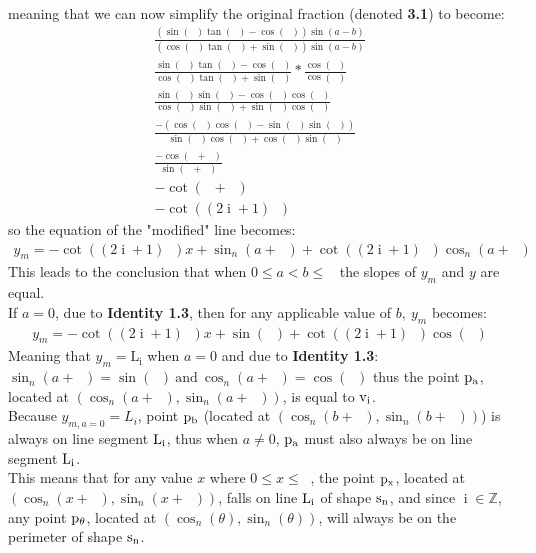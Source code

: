 \documentclass[11pt]{article}
\DeclareMathOperator{\custi}{\mathrm{i}}
\DeclareMathOperator{\period}{\frac{2\pi}{n}}
\DeclareMathOperator{\hp}{\frac{\pi}{n}}
\DeclareMathOperator{\iperiod}{\custi\frac{2\pi}{n}}
\begin{document}
\pagebreak\\
meaning that we can now simplify the original fraction (denoted \textbf{3.1}) to become:
\begin{gather*}
\frac{(\sin(\iperiod)\tan(\hp)-\cos(\iperiod))\sin(a-b)}{(\cos(\iperiod)\tan(\hp)+\sin(\iperiod))\sin(a-b)}\\
\frac{\sin(\iperiod)\tan(\hp)-\cos(\iperiod)}{\cos(\iperiod)\tan(\hp)+\sin(\iperiod)} * \frac{\cos(\hp)}{\cos(\hp)}\\
\frac{\sin(\iperiod)\sin(\hp)-\cos(\iperiod)\cos(\hp)}{\cos(\iperiod)\sin(\hp)+\sin(\iperiod)\cos(\hp)}\\
\frac{-(\cos(\iperiod)\cos(\hp)-\sin(\iperiod)\sin(\hp))}{\sin(\hp)\cos(\iperiod)+\cos(\hp)\sin(\iperiod)}\\
\frac{-\cos(\iperiod+\hp)}{\sin(\iperiod+\hp)}\\
-\cot(\iperiod+\hp)\\
-\cot((2\custi+1)\hp)
\end{gather*}
so the equation of the "modified" line becomes:
\begin{gather*}
y_m=-\cot((2\custi+1)\hp)x+\sin_n(a+\iperiod)+\cot((2\custi+1)\hp)\cos_n(a+\iperiod)
\end{gather*}
This leads to the conclusion that when \(0\leq a<b\leq\period\) the slopes of \(y_m\) and \(y\) are equal. \\
If \(a=0\), due to \textbf{Identity 1.3}, then for any applicable value of \(b,\ y_m\) becomes:
\begin{gather*}
y_m=-\cot((2\custi+1)\hp)x+\sin(\iperiod)+\cot((2\custi+1)\hp)\cos(\iperiod)
\end{gather*}
Meaning that \(y_m=\mathrm{L_i}\) when \(a=0\) and due to \textbf{Identity 1.3}: \(\sin_n(a+\iperiod)=\sin(\iperiod) \mathrm{\ and\ } \cos_n(a+\iperiod)=\cos(\iperiod)\) thus the point \(\rm p_a\), located at \((\cos_n(a+\iperiod), \sin_n(a+\iperiod))\), is equal to \(\rm v_i\).\\
Because \(y_{m,a=0} = L_i\), point \(\rm p_b\) (located at \((\cos_n(b+\iperiod),\sin_n(b+\iperiod))\)) is always on line segment \(\rm L_i\), thus when \(a\neq0\), \(\rm p_a\) must also always be on line segment \(\rm L_i\).\\
This means that for any value \(x\) where \(0\leq x \leq\period\), the point \(\rm p_x\), located at \((\cos_n(x+\iperiod),\sin_n(x+\iperiod))\), falls on line \(\rm L_i\) of shape \(\rm s_n\), and since \(\custi\in\mathbb{Z}\), any point \(\rm p_\theta\), located at \((\cos_n(\theta),\sin_n(\theta))\), will always be on the perimeter of shape \(\rm s_n\).
\end{document}
